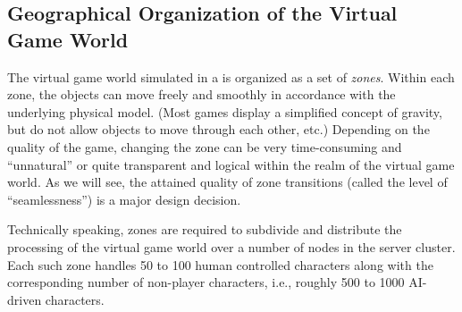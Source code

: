 \documentclass[a4paper, 10pt]{book}
\begin{document}


\subsection{Geographical Organization of the Virtual Game World} 
\label{sec:geographical-organization}

The virtual game world simulated in a \MMORG is organized as a set of
\emph{zones}. Within each zone, the objects can move freely and smoothly
in accordance with 
the underlying physical model. (Most games display a simplified
concept of gravity, but do not allow objects to move through each other, 
etc.) Depending on the quality of the game, changing the zone can be
very time-consuming and ``unnatural'' or quite transparent and logical
within the realm of the virtual game world.  As we will see, the attained
quality of zone transitions (called the level of ``seamlessness'') 
is a major design decision.

Technically speaking, zones are required to subdivide and distribute
the processing of the virtual game world over a number of nodes in the server
cluster. Each such zone handles 50 to 100 human controlled characters
along with the corresponding number of non-player characters, i.e., roughly 500
to 1000 AI-driven characters.

\end{document}
